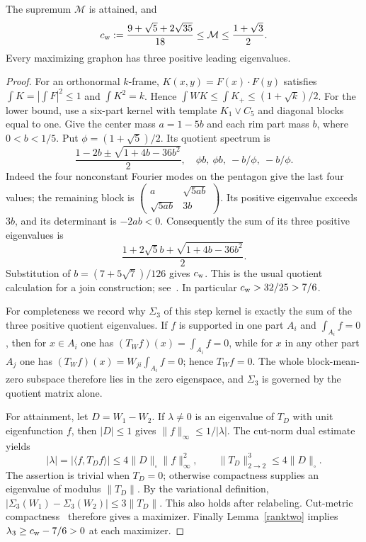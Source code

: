 \begin{lemma}\label{attainment}
The supremum $\mathcal M$ is attained, and
\[
 c_{\mathrm{w}}:=\frac{9+\sqrt5+2\sqrt{35}}{18}\le\mathcal M
       \le\frac{1+\sqrt3}{2}.
\]
Every maximizing graphon has three positive leading eigenvalues.
\end{lemma}
\begin{proof}
For an orthonormal $k$-frame, $K(x,y)=F(x)\cdot F(y)$ satisfies
$\int K=|\int F|^2\le1$ and $\int K^2=k$. Hence
$\int WK\le\int K_+\le(1+\sqrt k)/2$.
For the lower bound, use a six-part kernel with template $K_1\vee C_5$
and diagonal blocks equal to one. Give the center mass $a=1-5b$ and each
rim part mass $b$, where $0<b<1/5$. Put $\phi=(1+\sqrt5)/2$.
Its quotient spectrum is
\[
 \frac{1-2b\pm\sqrt{1+4b-36b^2}}2,
 \quad\phi b,\ \phi b,\ -b/\phi,\ -b/\phi.
\]
Indeed the four nonconstant Fourier modes on the pentagon give the last
four values; the remaining block is
$\left(\begin{smallmatrix}a&\sqrt{5ab}\\\sqrt{5ab}&3b\end{smallmatrix}\right)$.
Its positive eigenvalue exceeds $3b$, and its determinant is $-2ab<0$.
Consequently the sum of its three positive eigenvalues is
\[
 \frac{1+2\sqrt5 b+\sqrt{1+4b-36b^2}}2.
\]
Substitution of $b=(7+5\sqrt7)/126$ gives $c_{\mathrm{w}}$.
This is the usual quotient calculation for a join construction;
see~\cite{Hjoin}. In particular $c_{\mathrm{w}}>32/25>7/6$.

For completeness we record why $\Sigma_3$ of this step kernel is exactly the
sum of the three positive quotient eigenvalues. If $f$ is supported in one
part $A_i$ and $\int_{A_i}f=0$, then for $x\in A_i$ one has
$(T_Wf)(x)=\int_{A_i}f=0$, while for $x$ in any other part $A_j$ one has
$(T_Wf)(x)=W_{ji}\int_{A_i}f=0$; hence $T_Wf=0$. The whole block-mean-zero
subspace therefore lies in the zero eigenspace, and $\Sigma_3$ is governed
by the quotient matrix alone.

For attainment, let $D=W_1-W_2$. If $\lambda\ne0$ is an eigenvalue of
$T_D$ with unit eigenfunction $f$, then $|D|\le1$ gives
$\|f\|_\infty\le1/|\lambda|$. The cut-norm dual estimate yields
\[
 |\lambda|=|\langle f,T_Df\rangle|
 \le4\|D\|_\square\|f\|_\infty^2,
 \qquad \|T_D\|_{2\to2}^3\le4\|D\|_\square.
\]
The assertion is trivial when $T_D=0$; otherwise compactness supplies an
eigenvalue of modulus $\|T_D\|$. By the variational definition,
$|\Sigma_3(W_1)-\Sigma_3(W_2)|\le3\|T_D\|$. This also holds after
relabeling. Cut-metric compactness~\cite{LS} therefore gives a maximizer.
Finally Lemma~\ref{ranktwo} implies
$\lambda_3\ge c_{\mathrm{w}}-7/6>0$ at each maximizer.
\end{proof}


